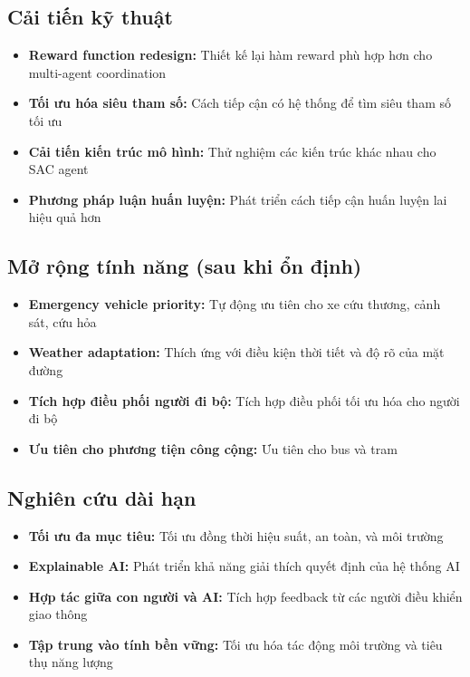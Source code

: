 \subsection{Cải tiến kỹ thuật}
\begin{itemize}
    \item \textbf{Reward function redesign:} Thiết kế lại hàm reward phù hợp hơn
        cho multi-agent coordination

    \item \textbf{Tối ưu hóa siêu tham số:} Cách tiếp cận có hệ thống để tìm
        siêu tham số tối ưu

    \item \textbf{Cải tiến kiến trúc mô hình:} Thử nghiệm các kiến trúc
        khác nhau cho SAC agent

    \item \textbf{Phương pháp luận huấn luyện:} Phát triển cách tiếp cận huấn luyện lai
        hiệu quả hơn
\end{itemize}

\subsection{Mở rộng tính năng (sau khi ổn định)}
\begin{itemize}
    \item \textbf{Emergency vehicle priority:} Tự động ưu tiên cho xe cứu thương,
        cảnh sát, cứu hỏa

    \item \textbf{Weather adaptation:} Thích ứng với điều kiện thời tiết và
        độ rõ của mặt đường

    \item \textbf{Tích hợp điều phối người đi bộ:} Tích hợp điều phối tối ưu hóa cho người đi bộ


    \item \textbf{Ưu tiên cho phương tiện công cộng:} Ưu tiên cho bus và tram
\end{itemize}

\subsection{Nghiên cứu dài hạn}
\begin{itemize}
    \item \textbf{Tối ưu đa mục tiêu:} Tối ưu đồng thời hiệu suất, an toàn,
        và môi trường

    \item \textbf{Explainable AI:} Phát triển khả năng giải thích quyết định của
        hệ thống AI

    \item \textbf{Hợp tác giữa con người và AI:} Tích hợp feedback từ các
        người điều khiển giao thông

    \item \textbf{Tập trung vào tính bền vững:} Tối ưu hóa tác động môi trường và
        tiêu thụ năng lượng
\end{itemize}

